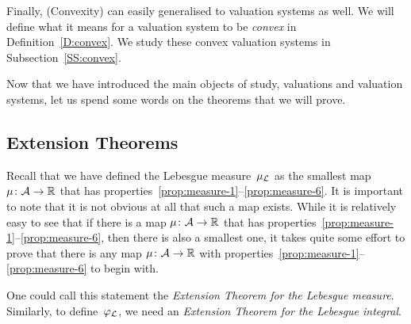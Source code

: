 \documentclass[main.tex]{subfiles}
\begin{document}
Finally,
(Convexity)
can easily generalised to valuation systems as well.
We will define what it means
for a valuation system to be \emph{convex}
in  Definition~\ref{D:convex}.
We study these convex valuation systems in Subsection~\ref{SS:convex}.

\vspace{1em}
\noindent
Now that we have introduced
the main objects of study,
valuations and valuation systems,
let us spend some words on the theorems that we will prove.


\subsection{Extension Theorems}
Recall that we have defined
the Lebesgue measure~$\mu_{\mathcal{L}}$
as the smallest map $\mu\colon \mathcal{A}\rightarrow \mathbb{R}$
that has properties~\ref{prop:measure-1}--\ref{prop:measure-6}.
It is important to note that
it is not obvious at all that such a map exists.
While it is relatively easy to see
that if there is a map $\mu\colon \mathcal{A} \rightarrow \mathbb{R}$
that has properties~\ref{prop:measure-1}--\ref{prop:measure-6},
then there is also a smallest one,
it takes quite some effort
to prove that there is any map $\mu\colon \mathcal{A}\rightarrow \mathbb{R}$
with properties~\ref{prop:measure-1}--\ref{prop:measure-6} to begin with.

One could call this statement the \emph{Extension Theorem
for the Lebesgue measure}.
Similarly,
to define~$\varphi_{\mathcal{L}}$,
we need an \emph{Extension Theorem
for the Lebesgue integral}.
\end{document}
